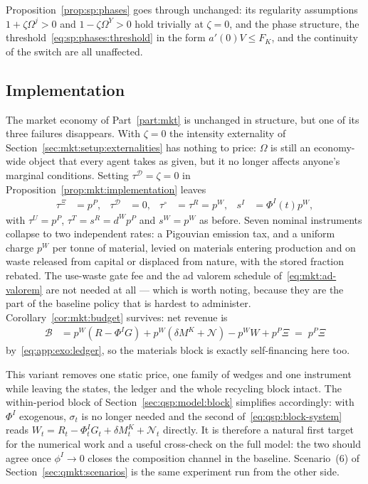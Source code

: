 Proposition~\ref{prop:sp:phases} goes through unchanged: its regularity assumptions
$1+\zeta\Omega^j>0$ and $1-\zeta\Omega^Y>0$ hold trivially at $\zeta=0$, and the phase structure, the
threshold~\eqref{eq:sp:phases:threshold} in the form $a'\!\left(0\right)V\le F_K$, and the continuity of
the switch are all unaffected.

\subsection{Implementation}\label{sec:app:exo:market}

The market economy of Part~\ref{part:mkt} is unchanged in structure, but one of its three failures
disappears. With $\zeta=0$ the intensity externality of
Section~\ref{sec:mkt:setup:externalities} has nothing to price: $\Omega$ is still an economy-wide
object that every agent takes as given, but it no longer affects anyone's marginal conditions. Setting
$\tau^{\mathcal D}=\zeta=0$ in Proposition~\ref{prop:mkt:implementation} leaves
\begin{align}
\tau^{\Xi} &= p^P,
&
\tau^{\mathcal D} &= 0,
&
\tau^{\circ} &= \tau^R = p^W,
&
s^I &= \Phi^I\!\left(t\right)p^W,
\label{eq:app:exo:policy}
\end{align}
with $\tau^U=p^P$, $\tau^T=s^R=d^Wp^P$ and $s^W=p^W$ as before. Seven nominal instruments collapse to
two independent rates: a Pigouvian emission tax, and a uniform charge $p^W$ per tonne of material,
levied on materials entering production and on waste released from capital or displaced from nature,
with the stored fraction rebated. The use-waste gate fee and the ad valorem schedule
of~\eqref{eq:mkt:ad-valorem} are not needed at all --- which is worth noting, because they are the part
of the baseline policy that is hardest to administer. Corollary~\ref{cor:mkt:budget} survives: net
revenue is
\begin{align}
\mathcal B &= p^W\left(R-\Phi^IG\right)+p^W\left(\delta M^K+\mathcal N\right)-p^WW+p^P\Xi \;=\; p^P\Xi
\label{eq:app:exo:budget}
\end{align}
by~\eqref{eq:app:exo:ledger}, so the materials block is exactly self-financing here too.

\begin{remark}\label{rem:app:exo:numerics}
This variant removes one static price, one family of wedges and one instrument while leaving the
states, the ledger and the whole recycling block intact. The within-period block of
Section~\ref{sec:qsp:model:block} simplifies accordingly: with $\Phi^I$ exogenous, $\sigma_t$ is no
longer needed and the second of~\eqref{eq:qsp:block-system} reads
$W_t=R_t-\Phi^I_tG_t+\delta M^K_t+\mathcal N_t$ directly. It is therefore a natural first target for
the numerical work and a useful cross-check on the full model: the two should agree once
$\phi^I\to0$ closes the composition channel in the baseline. Scenario~(6) of
Section~\ref{sec:qmkt:scenarios} is the same experiment run from the other side.
\end{remark}
